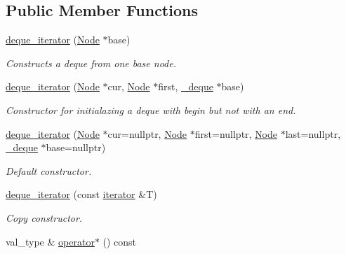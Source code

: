 \subsection*{Public Member Functions}
\begin{DoxyCompactItemize}
\item 
\hypertarget{structdeque__iterator_aa5f3b1440b64538a1979b1c266b4a1ff}{}\label{structdeque__iterator_aa5f3b1440b64538a1979b1c266b4a1ff} 
\hyperlink{structdeque__iterator_aa5f3b1440b64538a1979b1c266b4a1ff}{deque\+\_\+iterator} (\hyperlink{structnode}{Node} $\ast$base)
\begin{DoxyCompactList}\small\item\em Constructs a deque from one base node. \end{DoxyCompactList}\item 
\hypertarget{structdeque__iterator_a457004a94b85b521634813bb75a3dd1d}{}\label{structdeque__iterator_a457004a94b85b521634813bb75a3dd1d} 
\hyperlink{structdeque__iterator_a457004a94b85b521634813bb75a3dd1d}{deque\+\_\+iterator} (\hyperlink{structnode}{Node} $\ast$cur, \hyperlink{structnode}{Node} $\ast$first, \hyperlink{classdeque__base}{\+\_\+deque} $\ast$base)
\begin{DoxyCompactList}\small\item\em Constructor for initialazing a deque with begin but not with an end. \end{DoxyCompactList}\item 
\hypertarget{structdeque__iterator_ab48955425cddfe781c32b0c44e0f7121}{}\label{structdeque__iterator_ab48955425cddfe781c32b0c44e0f7121} 
\hyperlink{structdeque__iterator_ab48955425cddfe781c32b0c44e0f7121}{deque\+\_\+iterator} (\hyperlink{structnode}{Node} $\ast$cur=nullptr, \hyperlink{structnode}{Node} $\ast$first=nullptr, \hyperlink{structnode}{Node} $\ast$last=nullptr, \hyperlink{classdeque__base}{\+\_\+deque} $\ast$base=nullptr)
\begin{DoxyCompactList}\small\item\em Default constructor. \end{DoxyCompactList}\item 
\hyperlink{structdeque__iterator_acaad7042cd8df81283bd4834ba07ad30}{deque\+\_\+iterator} (const \hyperlink{structdeque__iterator}{iterator} \&T)
\begin{DoxyCompactList}\small\item\em Copy constructor. \end{DoxyCompactList}\item 
val\+\_\+type \& \hyperlink{structdeque__iterator_aa5b4c3e1340a732ea04721f69170572d}{operator$\ast$} () const

\end{DoxyCompactItemize}
